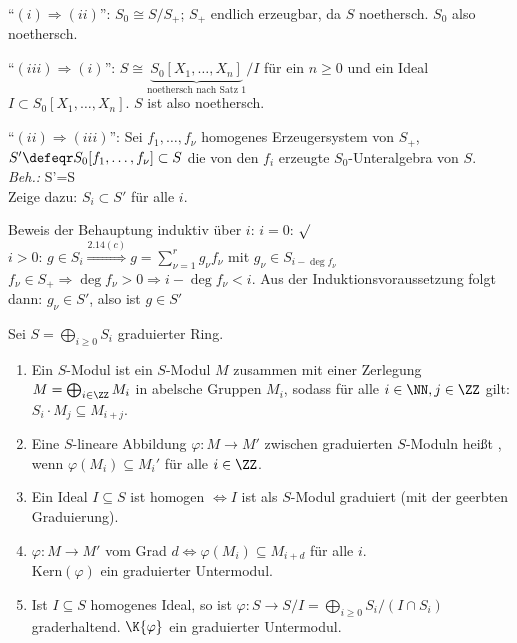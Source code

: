 \begin{Bew}
``$(i)\Rightarrow (ii)$'': $S_0\cong S/S_{+}$; $S_{+}$ endlich erzeugbar, da $S$ noethersch.
$S_0$ also noethersch.

``$(iii)\Rightarrow (i)$'': $S\cong \underbrace{S_0[X_1, \ldots, X_n]}_
{\text{noethersch nach Satz 1}}/I$ f\"ur ein $n\geq 0$
und ein Ideal $I\subset S_0[X_1, \ldots, X_n]$. $S$ ist also noethersch.

``$(ii)\Rightarrow (iii)$'': Sei $f_1, \ldots, f_\nu$ homogenes Erzeugersystem von $S_+$, 
$S'\defeqr S_0[f_1, \ldots, f_\nu]\subset S$ die von den $f_i$ erzeugte
$S_0$-Unteralgebra von $S$.\\
\emph{Beh.:} S'=S\\
Zeige dazu: $S_i\subset S'$ f\"ur alle $i$.

Beweis der Behauptung induktiv \"uber $i$:
$i=0$: $\surd$\\
$i> 0$: $g\in S_i\stackrel{2.14(c)}{\Rightarrow}g=\sum_{\nu=1}^{r} g_{\nu}f_\nu$ mit
$g_\nu\in S_{i-\deg{f_\nu}}$\\
$f_\nu\in S_{+} \Rightarrow \deg{f_\nu}> 0 \Rightarrow i-\deg{f_\nu} < i$.
Aus der Induktionsvoraussetzung folgt dann: $g_\nu\in S'$, also ist $g\in S'$
\end{Bew}

\begin{DefBem}
\label{2.16} Sei $S=\bigoplus_{i\geq 0}S_i$ graduierter Ring.
\begin{enumerate}

\item Ein  $S$-Modul ist ein $S$-Modul $M$ zusammen mit
einer Zerlegung $M=\bigoplus_{i\in\ZZ} M_i$ in abelsche Gruppen $M_i$,
sodass f\"ur alle $i\in\NN, j\in\ZZ$  gilt:
$S_i\cdot M_j\subseteq M_{i+j}$.

\item Eine $S$-lineare Abbildung $\varphi:M\to M'$ zwischen graduierten $S$-Moduln
hei\ss t , wenn $\varphi(M_i)\subseteq
M_i'$ f\"ur alle $i\in \ZZ$.

\item Ein Ideal $I\subseteq S$ ist homogen $\Leftrightarrow I$ ist als $S$-Modul
graduiert (mit der geerbten Graduierung).

\item $\varphi: M \to M'$ vom Grad $d \Leftrightarrow \varphi(M_i) \subseteq
      M_{i+d}$ für alle $i$.\\
      Kern$(\varphi)$ ein graduierter Untermodul.
      
\item Ist $I \subseteq S$ homogenes Ideal, so ist $\varphi: S \to S/I =
\bigoplus_{i \ge
0} S_i/(I \cap S_i)$ graderhaltend. $\K{\varphi}$ ein graduierter Untermodul.
\end{enumerate}
\end{DefBem}


